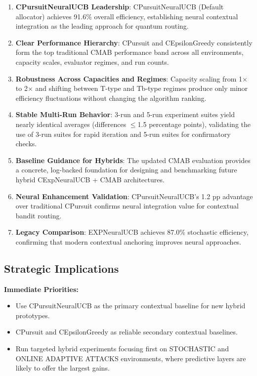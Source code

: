 \documentclass[12pt,a4paper]{article}
\newcommand{\legacy}[1]{\textcolor{legacycolor}{\textbf{#1}}}
\newcommand{\neural}[1]{\textcolor{neuralcolor}{\textbf{#1}}}
\begin{document}
\begin{enumerate}
\item \textbf{CPursuitNeuralUCB Leadership}: CPursuitNeuralUCB (Default allocator) achieves 91.6\% overall efficiency, establishing neural contextual integration as the leading approach for quantum routing.
\item \textbf{Clear Performance Hierarchy}: CPursuit and CEpsilonGreedy consistently form the top traditional CMAB performance band across all environments, capacity scales, evaluator regimes, and run counts.
\item \textbf{Robustness Across Capacities and Regimes}: Capacity scaling from 1$\times$ to 2$\times$ and shifting between T-type and Tb-type regimes produce only minor efficiency fluctuations without changing the algorithm ranking.
\item \textbf{Stable Multi-Run Behavior}: 3-run and 5-run experiment suites yield nearly identical averages (differences $\leq$1.5 percentage points), validating the use of 3-run suites for rapid iteration and 5-run suites for confirmatory checks.
\item \textbf{Baseline Guidance for Hybrids}: The updated CMAB evaluation provides a concrete, log-backed foundation for designing and benchmarking future hybrid CExpNeuralUCB + CMAB architectures.
\item \neural{Neural Enhancement Validation}: CPursuitNeuralUCB's 1.2 pp advantage over traditional CPursuit confirms neural integration value for contextual bandit routing.
\item \legacy{Legacy Comparison}: EXPNeuralUCB achieves 87.0\% stochastic efficiency, confirming that modern contextual anchoring improves neural approaches.
\end{enumerate}

\subsection{Strategic Implications}

\textbf{Immediate Priorities:}
\begin{itemize}
\item Use CPursuitNeuralUCB as the primary contextual baseline for new hybrid prototypes.
\item CPursuit and CEpsilonGreedy as reliable secondary contextual baselines.
\item Run targeted hybrid experiments focusing first on STOCHASTIC and ONLINE ADAPTIVE ATTACKS environments, where predictive layers are likely to offer the largest gains.
\end{itemize}
\end{document}
